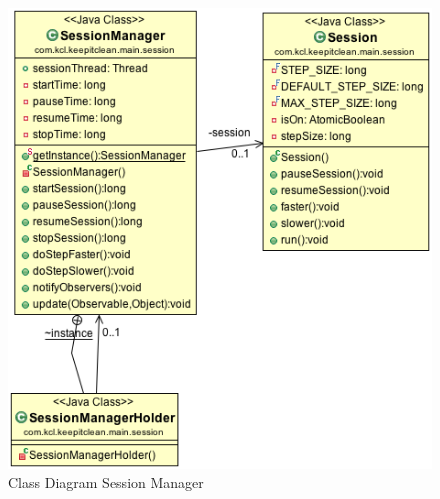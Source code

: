\documentclass[11pt]{article}
\begin{document}
\begin{enumerate}
\begin{figure}[H]
        \includegraphics[width=12cm]{session} 
        \centering
        \caption{Class Diagram Session Manager} 
        \label{cdsessionmanager}
\end{figure}


\end{enumerate}
\end{document}
